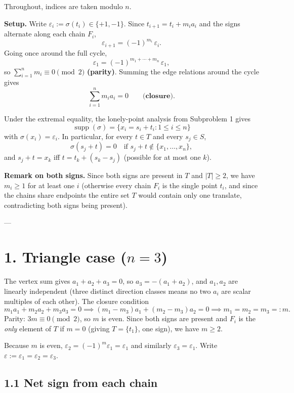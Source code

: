 Throughout, indices are taken modulo \(n\).

\textbf{Setup.}
Write \(\varepsilon_i := \sigma(t_i)\in\{+1,-1\}\).
Since \(t_{i+1}=t_i+m_ia_i\) and the signs alternate along each chain \(F_i\),
\[
  \varepsilon_{i+1} = (-1)^{m_i}\,\varepsilon_i.
\]
Going once around the full cycle,
\[
  \varepsilon_1 = (-1)^{m_1+\cdots+m_n}\,\varepsilon_1,
\]
so \(\sum_{i=1}^n m_i \equiv 0\pmod{2}\) \textbf{(parity)}.  Summing the edge relations around the cycle gives
\[
  \sum_{i=1}^n m_i a_i = 0 \qquad\textbf{(closure)}.
\]

Under the extremal equality, the lonely-point analysis from Subproblem 1 gives
\[
  \operatorname{supp}(\sigma)=\{x_i=s_i+t_i:1\le i\le n\}
\]
with \(\sigma(x_i)=\varepsilon_i\).  In particular, for every \(t\in T\) and every \(s_j\in S\),
\begin{equation}\label{eq:cancel}
  \sigma(s_j+t)=0 \quad\text{if }s_j+t\notin\{x_1,\dots,x_n\},
  \tag{$*$}
\end{equation}
and \(s_j+t=x_k\) iff \(t=t_k+(s_k-s_j)\) (possible for at most one \(k\)).

\textbf{Remark on both signs.}
Since both signs are present in \(T\) and \(|T|\ge 2\), we have \(m_i\ge 1\) for at least one \(i\) (otherwise every chain \(F_i\) is the single point \(t_i\), and since the chains share endpoints the entire set $T$ would contain only one translate, contradicting both signs being present).

---

\section*{1. Triangle case (\(n=3\))}

The vertex sum gives \(a_1+a_2+a_3=0\), so \(a_3=-(a_1+a_2)\), and \(a_1,a_2\) are linearly independent (three distinct direction classes means no two \(a_i\) are scalar multiples of each other).  The closure condition
\[
  m_1 a_1+m_2 a_2+m_3 a_3=0
  \implies (m_1-m_3)a_1+(m_2-m_3)a_2=0
  \implies m_1=m_2=m_3=:m.
\]
Parity: \(3m\equiv 0\pmod 2\), so \(m\) is even.  Since both signs are present and \(F_i\) is the \emph{only} element of \(T\) if \(m=0\) (giving \(T=\{t_1\}\), one sign), we have \(m\ge 2\).

Because \(m\) is even, \(\varepsilon_2=(-1)^m\varepsilon_1=\varepsilon_1\) and similarly \(\varepsilon_3=\varepsilon_1\).  Write \(\varepsilon:=\varepsilon_1=\varepsilon_2=\varepsilon_3\).

\subsection*{1.1 Net sign from each chain}

